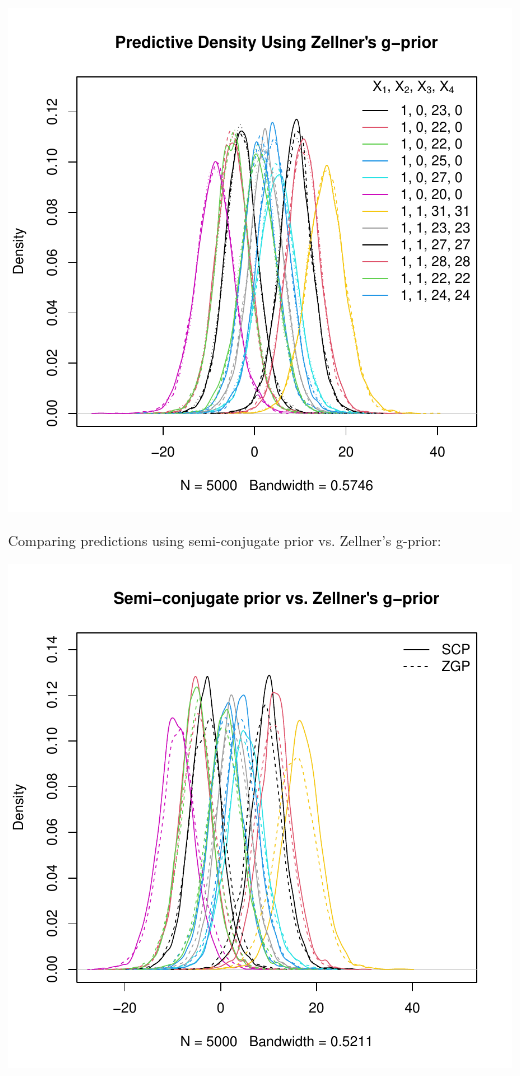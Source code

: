 \documentclass[12pt, a4paper]{article}
\begin{document}



\includegraphics{Thesis-015}

\clearpage

Comparing predictions using semi-conjugate prior vs. Zellner's g-prior:

\includegraphics{Thesis-016}
\end{document}
